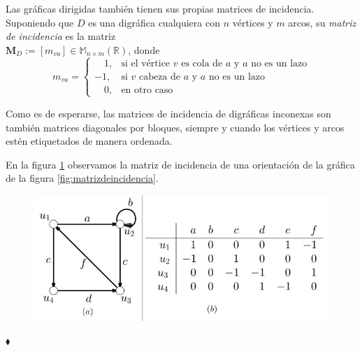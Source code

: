 Las gráficas dirigidas también tienen sus propias matrices de incidencia. Suponiendo que $D$ es una digráfica cualquiera con $n$ vértices y $m$ arcos, su \textit{matriz de incidencia} es la matriz\\ $\mathbf{M}_{D}:= [m_{va}] \in \mathbb{M}_{n \times m}(\mathbb{R})$, donde
$$ m_{va}=
\begin{cases}
\quad \! 1, & \text{si el vértice } v \text{ es cola de } a \text{ y } a \text{ no es un lazo}\\ 
-1, & \text{si } v \text{ cabeza de } a \text{ y } a \text{ no es un lazo}\\ 
\quad \! 0, & \text{en otro caso}
\end{cases}
$$

Como es de esperarse, las matrices de incidencia de digráficas inconexas son también matrices diagonales por bloques, siempre y cuando los vértices y arcos estén etiquetados de manera ordenada.

\begin{ejem}
En la figura \ref{fig:matrizdeincidenciadigrafica} observamos la matriz de incidencia de una orientación de la gráfica de la figura \ref{fig:matrizdeincidencia}.
\begin{figure}[H]
    \centering
    \vspace{-0.8cm}
    \includegraphics[scale=0.6]{img/imgchapter1/matrizDeIncidenciaDigrafica.jpg}
    \caption{}
    \label{fig:matrizdeincidenciadigrafica}
\end{figure}
\vspace{-0.5cm}
\hfill $\blacklozenge$
\end{ejem}







 